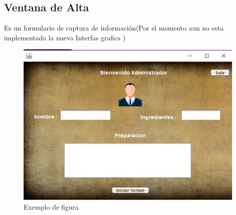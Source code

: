 \documentclass[10pt,a4paper]{report}
\begin{document}

\begin{titlepage}
\begin{flushleft}

\section{Ventana de Alta}
Es un formulario de captura de información(Por el momento aun no esta implementada la nueva Interfas grafica )
\begin{figure}[ht]
\centering
\includegraphics[width=1\textwidth]{41.jpg}
\caption{Exemplo de figura}
\label{fig:figura1}
\end{figure}
	
\vspace{1cm}

\end{flushleft} 
\end{titlepage}

\end{document}
